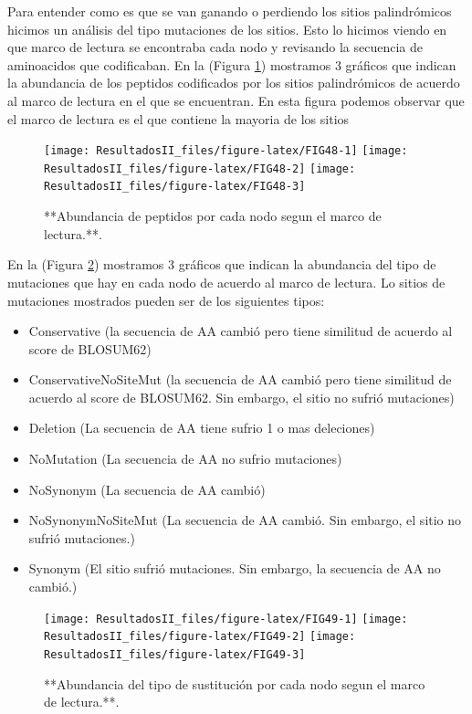 \documentclass[
]{book}
\providecommand{\tightlist}{%
  \setlength{\itemsep}{0pt}\setlength{\parskip}{0pt}}
\begin{document}
Para entender como es que se van ganando o perdiendo los sitios palindrómicos hicimos un análisis del tipo mutaciones de los sitios. Esto lo hicimos viendo en que marco de lectura se encontraba cada nodo y revisando la secuencia de aminoacidos que codificaban. En la (Figura \ref{fig:FIG48}) mostramos 3 gráficos que indican la abundancia de los peptidos codificados por los sitios palindrómicos de acuerdo al marco de lectura en el que se encuentran. En esta figura podemos observar que el marco de lectura es el que contiene la mayoria de los sitios

\begin{figure}

{\centering \texttt{[image: ResultadosII\_files/figure-latex/FIG48-1]} \texttt{[image: ResultadosII\_files/figure-latex/FIG48-2]} \texttt{[image: ResultadosII\_files/figure-latex/FIG48-3]} 

}

\caption{**Abundancia de peptidos por cada nodo segun el marco de lectura.**.}\label{fig:FIG48}
\end{figure}

En la (Figura \ref{fig:FIG49}) mostramos 3 gráficos que indican la abundancia del tipo de mutaciones que hay en cada nodo de acuerdo al marco de lectura. Lo sitios de mutaciones mostrados pueden ser de los siguientes tipos:

\begin{itemize}
\tightlist
\item
  Conservative (la secuencia de AA cambió pero tiene similitud de acuerdo al score de BLOSUM62)
\item
  ConservativeNoSiteMut (la secuencia de AA cambió pero tiene similitud de acuerdo al score de BLOSUM62. Sin embargo, el sitio no sufrió mutaciones)
\item
  Deletion (La secuencia de AA tiene sufrio 1 o mas deleciones)
\item
  NoMutation (La secuencia de AA no sufrio mutaciones)
\item
  NoSynonym (La secuencia de AA cambió)
\item
  NoSynonymNoSiteMut (La secuencia de AA cambió. Sin embargo, el sitio no sufrió mutaciones.)
\item
  Synonym (El sitio sufrió mutaciones. Sin embargo, la secuencia de AA no cambió.)
\end{itemize}

\begin{figure}

{\centering \texttt{[image: ResultadosII\_files/figure-latex/FIG49-1]} \texttt{[image: ResultadosII\_files/figure-latex/FIG49-2]} \texttt{[image: ResultadosII\_files/figure-latex/FIG49-3]} 

}

\caption{**Abundancia del tipo de sustitución por cada nodo segun el marco de lectura.**.}\label{fig:FIG49}
\end{figure}
\end{document}

